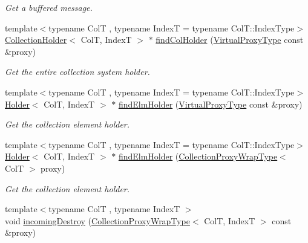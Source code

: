 \begin{DoxyCompactItemize}
\begin{DoxyCompactList}\small\item\em Get a buffered message. \end{DoxyCompactList}\item 
{\footnotesize template$<$typename ColT , typename IndexT  = typename Col\+T\+::\+Index\+Type$>$ }\\\hyperlink{structvt_1_1vrt_1_1collection_1_1_collection_holder}{Collection\+Holder}$<$ ColT, IndexT $>$ $\ast$ \hyperlink{structvt_1_1vrt_1_1collection_1_1_collection_manager_ac3fe0114969d91628d612eccc2166159}{find\+Col\+Holder} (\hyperlink{namespacevt_a1b417dd5d684f045bb58a0ede70045ac}{Virtual\+Proxy\+Type} const \&proxy)
\begin{DoxyCompactList}\small\item\em Get the entire collection system holder. \end{DoxyCompactList}\item 
{\footnotesize template$<$typename ColT , typename IndexT  = typename Col\+T\+::\+Index\+Type$>$ }\\\hyperlink{structvt_1_1vrt_1_1collection_1_1_holder}{Holder}$<$ ColT, IndexT $>$ $\ast$ \hyperlink{structvt_1_1vrt_1_1collection_1_1_collection_manager_a06ff4b51fe7e15c8c4b7768cf7a1ad03}{find\+Elm\+Holder} (\hyperlink{namespacevt_a1b417dd5d684f045bb58a0ede70045ac}{Virtual\+Proxy\+Type} const \&proxy)
\begin{DoxyCompactList}\small\item\em Get the collection element holder. \end{DoxyCompactList}\item 
{\footnotesize template$<$typename ColT , typename IndexT  = typename Col\+T\+::\+Index\+Type$>$ }\\\hyperlink{structvt_1_1vrt_1_1collection_1_1_holder}{Holder}$<$ ColT, IndexT $>$ $\ast$ \hyperlink{structvt_1_1vrt_1_1collection_1_1_collection_manager_aa7f2e2fbbd73a3d7111904c0b31807e6}{find\+Elm\+Holder} (\hyperlink{structvt_1_1vrt_1_1collection_1_1_collection_manager_a56458ed7f9bb22b631b9b3a745f42f94}{Collection\+Proxy\+Wrap\+Type}$<$ ColT $>$ proxy)
\begin{DoxyCompactList}\small\item\em Get the collection element holder. \end{DoxyCompactList}\item 
{\footnotesize template$<$typename ColT , typename IndexT $>$ }\\void \hyperlink{structvt_1_1vrt_1_1collection_1_1_collection_manager_a79d8ce89b21670fe0d482646aca4a2a4}{incoming\+Destroy} (\hyperlink{structvt_1_1vrt_1_1collection_1_1_collection_manager_a56458ed7f9bb22b631b9b3a745f42f94}{Collection\+Proxy\+Wrap\+Type}$<$ ColT, IndexT $>$ const \&proxy)

\end{DoxyCompactItemize}
